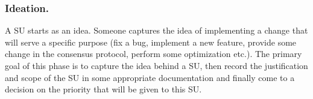 \subsubsection{Ideation.}
A SU starts as an idea. Someone captures the idea of implementing a change that
will serve a specific purpose (fix a bug, implement a new feature, provide some
change in the consensus protocol, perform some optimization etc.). The primary
goal of this phase is to capture the idea behind a SU, then record the
justification and scope of the SU in some appropriate documentation and finally
come to a decision on the priority that will be given to this SU.


%

